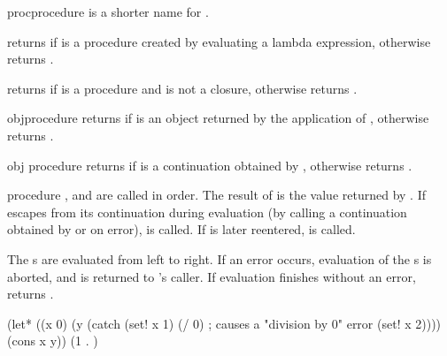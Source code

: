 \begin{entry}{%
 { proc}{procedure}}
\saut
{} is a shorter name for .
\end{entry}

\begin{entry}{%
}
\saut
returns {\schtrue} if  is a procedure created by evaluating a
lambda expression, otherwise returns {\schfalse}.
\end{entry}

\begin{entry}{%
}
\saut
returns {\schtrue} if  is a procedure and is not a closure,
otherwise returns {\schfalse}.
\end{entry}

\begin{entry}{%
 { obj}{procedure}}
\saut
returns {\schtrue} if  is an object returned by the
application of , otherwise returns {\schfalse}.
\end{entry} 

\begin{entry}{%
 { obj} {procedure}}
\saut
{}
returns {\schtrue} if  is a continuation obtained by
, otherwise returns {\schfalse}.
\end{entry}

\begin{entry}{%
 {procedure}}
\saut
{},  and  are called in
order. The result of  is the value returned by
.  If  escapes from its continuation
during evaluation (by calling a continuation obtained by 
or on error),  is called. If  is later
reentered,  is called.
\end{entry}

\begin{entry}{%
 {   \dotsfoo} {\exprtype}}
\saut
The s are evaluated from left to right. If an error
occurs, evaluation of the s is aborted, and {\schtrue}
is returned to 's caller.  If evaluation finishes without
an error,  returns {\schfalse}.
\begin {scheme}
(let* ((x 0)
       (y (catch
             (set! x 1)
             (/ 0) ; causes a "division by 0" error
             (set! x 2))))
  (cons x y))   \lev (1 . {\schtrue})
\end{scheme}
\end{entry}


